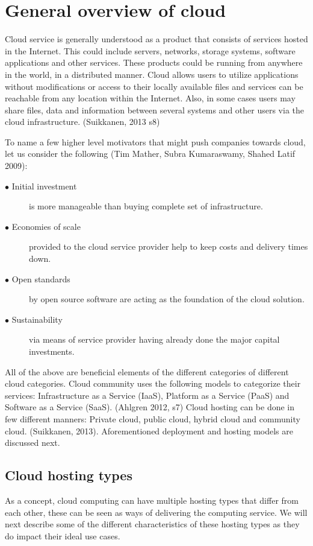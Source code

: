 \documentclass{article}
\begin{document}
\section{General overview of cloud}
Cloud service is generally understood as a product that consists of services hosted in the Internet. This could include servers, networks, storage systems, software applications and other services. These products could be running from anywhere in the world, in a distributed manner. Cloud allows users to utilize applications without modifications or access to their locally available files and services can be reachable from any location within the Internet. Also, in some cases users may share files, data and information between several systems and other users via the cloud infrastructure.
(Suikkanen, 2013 s8)
\par
To name a few higher level motivators that might push companies towards cloud, let us consider the following (Tim Mather, Subra Kumaraswamy, Shahed Latif 2009):
\begin{description}
        \item[$\bullet$ Initial investment] is more manageable than buying complete set of infrastructure.
        \item[$\bullet$ Economies of scale] provided to the cloud service provider help to keep costs and delivery times down.
        \item[$\bullet$ Open standards] by open source software are acting as the foundation of the cloud solution.
        \item[$\bullet$ Sustainability] via means of service provider having already done the major capital investments.
\end{description}
All of the above are beneficial elements of the different categories of different cloud categories.
Cloud community uses the following models to categorize their services: Infrastructure as a Service (IaaS), Platform as a Service (PaaS) and Software as a Service (SaaS). (Ahlgren 2012, s7)
Cloud hosting can be done in few different manners: Private cloud, public cloud, hybrid cloud and community cloud. (Suikkanen, 2013).
Aforementioned deployment and hosting models are discussed next.
\subsection{Cloud hosting types}
As a concept, cloud computing can have multiple hosting types that differ from each other, these can be seen as ways of delivering the computing service. We will next describe some of the different characteristics of these hosting types as they do impact their ideal use cases.
\end{document}

